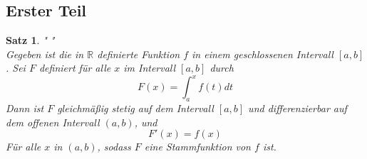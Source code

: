 \documentclass[fontsize=12pt,paper=a4,DIV12,cleardoublepage=empty, 
liststotoc,idxtotoc,bibtotoc]{article}
\newcommand{\RR}{\mathbb{R}}
\theoremstyle{plain}
\newtheorem{satz}{Satz}[subsection]
\theoremstyle{definition}
\begin{document}
	\subsection{Erster Teil}
	\begin{satz}" "\\
		Gegeben ist die in $\RR$ definierte Funktion $f$ in einem geschlossenen Intervall $[a, b]$. Sei $F$ definiert für alle $x$ im Intervall $[a, b]$ durch \\
			\begin{equation*}
				F(x)=\int_{a}^{x}f(t) dt
			\end{equation*}
		Dann ist $F$ gleichmäßig stetig auf dem Intervall $[a, b]$ und differenzierbar auf dem offenen Intervall $(a, b)$, und 
			\begin{equation*}
				F'(x)=f(x)
			\end{equation*}
		Für alle $x$ in $(a, b)$, sodass $F$ eine Stammfunktion von $f$ ist.\\
	\end{satz}
	
\end{document}
